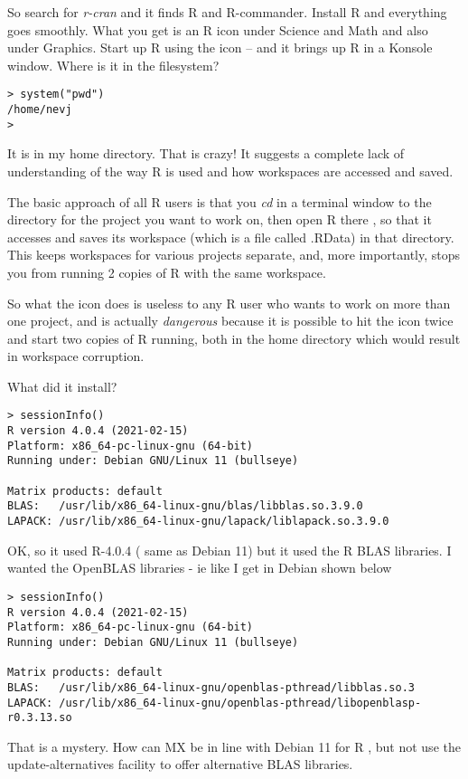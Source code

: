 \documentclass{article}  %
\begin{document}
So search for {\em r-cran} and it finds R and R-commander. Install R and everything goes smoothly. What you get is an R icon under Science and Math and also under Graphics. Start up R using the icon -- and it brings up R in a Konsole window.  Where is it in the filesystem?
\begin{verbatim}
> system("pwd")
/home/nevj
> 
\end{verbatim} 
It is in my home directory.  That is crazy! It suggests a complete lack of understanding of the way R is used and how workspaces are accessed and saved.

The basic approach of all R users is that you {\em cd} in a terminal window to the directory for the project you want to work on, then open R there , so that it accesses and saves its workspace (which is a file called .RData) in that directory. This keeps workspaces for various projects separate, and, more importantly, stops you from running 2 copies of R with the same workspace. 

So what the icon does  is useless to any R user who wants to work on more than one project, and is actually {\em dangerous} because it is possible to hit the icon  twice and start two copies of R running, both in the home directory which would result in workspace corruption.

What did it install?
\begin{verbatim}
> sessionInfo()
R version 4.0.4 (2021-02-15)
Platform: x86_64-pc-linux-gnu (64-bit)
Running under: Debian GNU/Linux 11 (bullseye)

Matrix products: default
BLAS:   /usr/lib/x86_64-linux-gnu/blas/libblas.so.3.9.0
LAPACK: /usr/lib/x86_64-linux-gnu/lapack/liblapack.so.3.9.0
\end{verbatim}

OK, so it used R-4.0.4 ( same as Debian 11) but it used the R BLAS libraries. I wanted the OpenBLAS libraries - ie like I get in Debian shown below
\begin{verbatim}
> sessionInfo()
R version 4.0.4 (2021-02-15)
Platform: x86_64-pc-linux-gnu (64-bit)
Running under: Debian GNU/Linux 11 (bullseye)

Matrix products: default
BLAS:   /usr/lib/x86_64-linux-gnu/openblas-pthread/libblas.so.3
LAPACK: /usr/lib/x86_64-linux-gnu/openblas-pthread/libopenblasp-r0.3.13.so
\end{verbatim}

That is a mystery. How can MX be in line with Debian 11 for R , but not use the update-alternatives facility to offer alternative BLAS libraries. 
\end{document}
